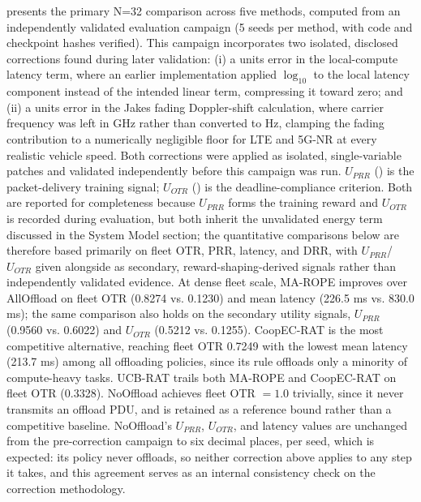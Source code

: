\documentclass[journal,10pt,twocolumn]{IEEEtran}
\begin{document}
 presents the primary N=32 comparison across five methods, computed from an independently validated evaluation campaign (5 seeds per method, with code and checkpoint hashes verified). This campaign incorporates two isolated, disclosed corrections found during later validation: (i) a units error in the local-compute latency term, where an earlier implementation applied $\log_{10}$ to the local latency component instead of the intended linear term, compressing it toward zero; and (ii) a units error in the Jakes fading Doppler-shift calculation, where carrier frequency was left in GHz rather than converted to Hz, clamping the fading contribution to a numerically negligible floor for LTE and 5G-NR at every realistic vehicle speed. Both corrections were applied as isolated, single-variable patches and validated independently before this campaign was run. $U_{PRR}$ () is the packet-delivery training signal; $U_{OTR}$ () is the deadline-compliance criterion. Both are reported for completeness because $U_{PRR}$ forms the training reward and $U_{OTR}$ is recorded during evaluation, but both inherit the unvalidated energy term discussed in the System Model section; the quantitative comparisons below are therefore based primarily on fleet OTR, PRR, latency, and DRR, with $U_{PRR}$/$U_{OTR}$ given alongside as secondary, reward-shaping-derived signals rather than independently validated evidence. At dense fleet scale, MA-ROPE improves over AllOffload on fleet OTR (0.8274 vs. 0.1230) and mean latency (226.5 ms vs. 830.0 ms); the same comparison also holds on the secondary utility signals, $U_{PRR}$ (0.9560 vs. 0.6022) and $U_{OTR}$ (0.5212 vs. 0.1255). CoopEC-RAT is the most competitive alternative, reaching fleet OTR 0.7249 with the lowest mean latency (213.7 ms) among all offloading policies, since its rule offloads only a minority of compute-heavy tasks. UCB-RAT trails both MA-ROPE and CoopEC-RAT on fleet OTR (0.3328). NoOffload achieves fleet OTR $=1.0$ trivially, since it never transmits an offload PDU, and is retained as a reference bound rather than a competitive baseline. NoOffload's $U_{PRR}$, $U_{OTR}$, and latency values are unchanged from the pre-correction campaign to six decimal places, per seed, which is expected: its policy never offloads, so neither correction above applies to any step it takes, and this agreement serves as an internal consistency check on the correction methodology.
\end{document}
